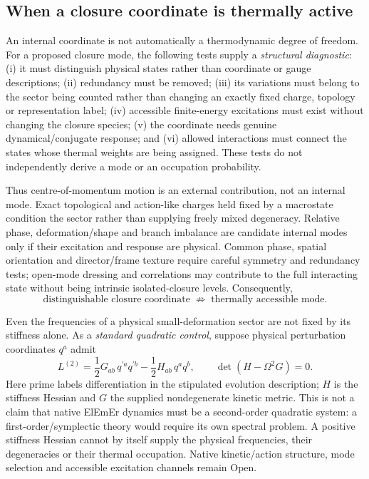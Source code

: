 \documentclass[11pt]{article}
\theoremstyle{definition}
\newcommand{\ElEmEr}{\mbox{ElEmEr}}
\begin{document}
\subsection{When a closure coordinate is thermally active}
\label{sec:thermal-activity-gate}

An internal coordinate is not automatically a thermodynamic degree of freedom.
For a proposed closure mode, the following tests supply a
\emph{structural diagnostic}: (i) it must distinguish physical states
rather than coordinate or gauge descriptions; (ii) redundancy must be removed;
(iii) its variations must belong to the sector being counted rather than changing
an exactly fixed charge, topology or representation label; (iv) accessible
finite-energy excitations must exist without changing the closure species;
(v) the coordinate needs genuine dynamical/conjugate response; and
(vi) allowed interactions must connect the states whose thermal weights are
being assigned. These tests do not independently derive a mode or an
occupation probability.

Thus centre-of-momentum motion is an external contribution, not an internal
mode. Exact topological and action-like charges held fixed by a macrostate
condition the sector rather than supplying freely mixed degeneracy. Relative
phase, deformation/shape and branch imbalance are candidate internal modes
only if their excitation and response are physical. Common phase, spatial
orientation and director/frame texture require careful symmetry and
redundancy tests; open-mode dressing and correlations may contribute to the
full interacting state without being intrinsic isolated-closure levels.
Consequently,
\begin{equation}
  \boxed{\text{distinguishable closure coordinate}
  \;\not\Rightarrow\;\text{thermally accessible mode}.}
  \label{eq:closure-thermal-activity-guard}
\end{equation}

Even the frequencies of a physical small-deformation sector are not fixed
by its stiffness alone. As a \emph{standard quadratic control}, suppose
physical perturbation coordinates $q^a$ admit
\begin{equation}
  L^{(2)}=\frac12 G_{ab}\,q^{\prime a}q^{\prime b}
           -\frac12 H_{ab}\,q^a q^b,
  \qquad
  \det(H-\Omega^2G)=0.
  \label{eq:closure-spectrum-control}
\end{equation}
Here prime labels differentiation in the stipulated evolution description;
$H$ is the stiffness Hessian and $G$ the supplied nondegenerate kinetic
metric. This is not a claim that native \ElEmEr{} dynamics must be a
second-order quadratic system: a first-order/symplectic theory would require
its own spectral problem. A positive stiffness Hessian cannot by itself
supply the physical frequencies, their degeneracies or their thermal
occupation. Native kinetic/action structure, mode selection and accessible
excitation channels remain Open.
\end{document}
